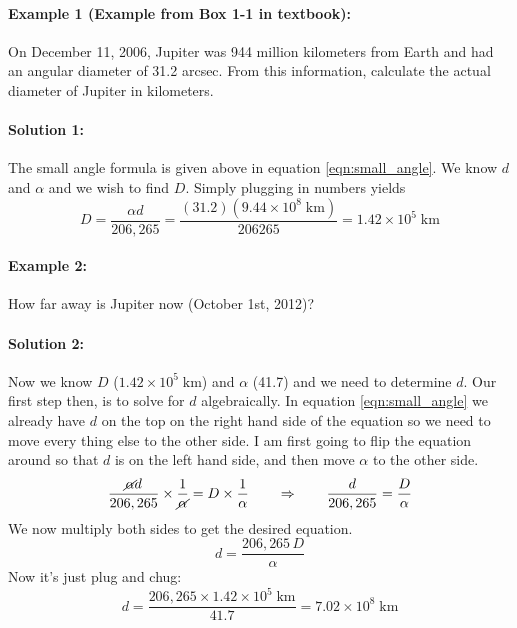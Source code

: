 \paragraph{Example 1 (Example from Box 1-1 in textbook):} On December 11, 2006, Jupiter was 944 million kilometers from Earth and had an angular diameter of 31.2 arcsec. From this information, calculate the actual diameter of Jupiter in kilometers.

\paragraph{Solution 1:} The small angle formula is given above in equation \ref{eqn:small_angle}.
We know $d$ and $\alpha$ and we wish to find $D$. Simply plugging in numbers yields
$$D=\frac{\alpha d}{206,265}=\frac{(31.2)(9.44\times 10^8\;\textrm{km})}{206265}=1.42\times 10^5\;\textrm{km}$$

\paragraph{Example 2:} How far away is Jupiter now (October 1st, 2012)?

\paragraph{Solution 2:} Now we know $D$ ($1.42\times 10^5\;\textrm{km}$) and $\alpha$ (41.7) and we need to determine $d$. Our first step then, is to solve for $d$ algebraically. In equation \ref{eqn:small_angle} we already have $d$ on the top on the right hand side of the equation so we need to move every thing else to the other side. I am first going to flip the equation around so that $d$ is on the left hand side, and then move $\alpha$ to the other side.
$$\frac{\cancel{\alpha} d}{206,265}\times\frac{1}{\cancel{\alpha}}=D\times\frac{1}{\alpha} \qquad \Rightarrow \qquad \frac{d}{206,265}=\frac{D}{\alpha}$$
We now multiply both sides to get the desired equation.
$$d=\frac{206,265\,D}{\alpha}$$
Now it's just plug and chug:
$$d=\frac{206,265\times1.42\times 10^5\;\textrm{km}}{41.7}=7.02\times10^8\;\textrm{km}$$